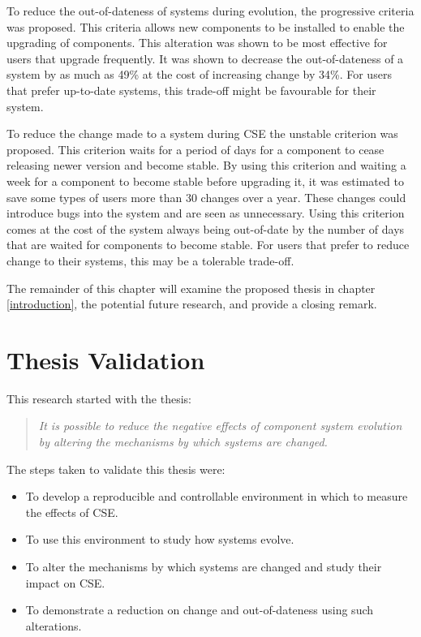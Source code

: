 To reduce the out-of-dateness of systems during evolution, the progressive criteria was proposed.
This criteria allows new components to be installed to enable the upgrading of components.
This alteration was shown to be most effective for users that upgrade frequently.
It was shown to decrease the out-of-dateness of a system by as much as 49\% at the cost of increasing change by 34\%.
For users that prefer up-to-date systems, this trade-off might be favourable for their system.

To reduce the change made to a system during CSE the unstable criterion was proposed.
This criterion waits for a period of days for a component to cease releasing newer version and become stable.
By using this criterion and waiting a week for a component to become stable before upgrading it, it was estimated to save some types of users more than 30 changes over a year.
These changes could introduce bugs into the system and are seen as unnecessary. 
Using this criterion comes at the cost of the system always being out-of-date by the number of days that are waited for components to become stable.
For users that prefer to reduce change to their systems, this may be a tolerable trade-off.

The remainder of this chapter will examine the proposed thesis in chapter \ref{introduction},
the potential future research,
and provide a closing remark.
\section{Thesis Validation}
This research started with the thesis:
\begin{quote}
\textit{It is possible to reduce the negative effects of component system evolution by altering the mechanisms by which systems are changed.} 
\end{quote}

The steps taken to validate this thesis were:
\begin{itemize}
  \item To develop a reproducible and controllable environment in which to measure the effects of CSE.
  \item To use this environment to study how systems evolve.
  \item To alter the mechanisms by which systems are changed and study their impact on CSE.
  \item To demonstrate a reduction on change and out-of-dateness using such alterations.
\end{itemize}

